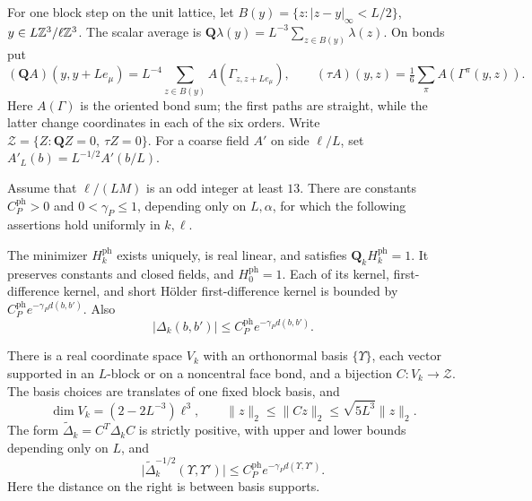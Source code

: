 For one block step on the unit lattice, let
\(B(y)=\{z:|z-y|_\infty<L/2\}\), \(y\in L\mathbb Z^3/\ell\mathbb Z^3\).
The scalar average is
\(\mathbf Q\lambda(y)=L^{-3}\sum_{z\in B(y)}\lambda(z)\).
On bonds put
\[
 (\mathbf QA)(y,y+Le_\mu)
   =L^{-4}\sum_{z\in B(y)}A(\Gamma_{z,z+Le_\mu}),\qquad
 (\tau A)(y,z)=\tfrac16\sum_\pi A(\Gamma^\pi(y,z)).
\]
Here \(A(\Gamma)\) is the oriented bond sum; the first paths are
straight, while the latter change coordinates in each of the six
orders. Write \(\mathcal Z=\{Z:\mathbf QZ=0,\ \tau Z=0\}\).
For a coarse field \(A'\) on side \(\ell/L\), set
\(A'_L(b)=L^{-1/2}A'(b/L)\).

\begin{theorem}\label{thm:maxwell-block}
Assume that \(\ell/(LM)\) is an odd integer at least \(13\).
There are constants \(C_P^{\mathrm{ph}}>0\) and
\(0<\gamma_P\le1\), depending only on \(L,\alpha\), for which
the following assertions hold uniformly in \(k,\ell\).

The minimizer \(H_k^{\mathrm{ph}}\) exists uniquely, is real
linear, and satisfies \(\mathbf Q_kH_k^{\mathrm{ph}}=1\).
It preserves constants and closed fields, and \(H_0^{\mathrm{ph}}=1\).
Each of its kernel, first-difference kernel, and short H\"older
first-difference kernel is bounded by
\(C_P^{\mathrm{ph}}e^{-\gamma_Pd(b,b')}\).
Also
\[
 |\Delta_k(b,b')|\le C_P^{\mathrm{ph}}e^{-\gamma_Pd(b,b')}.
\]

There is a real coordinate space \(V_k\) with an orthonormal
basis \(\{\Upsilon\}\), each vector supported in an \(L\)-block
or on a noncentral face bond, and a bijection \(C:V_k\to\mathcal Z\).
The basis choices are translates of one fixed block basis, and
\[
 \dim V_k=(2-2L^{-3})\ell^3,\qquad
 \|z\|_2\le\|Cz\|_2\le\sqrt{5L^3}\|z\|_2.
\]
The form \(\widetilde\Delta_k=C^T\Delta_kC\) is strictly positive,
with upper and lower bounds depending only on \(L\), and
\[
 \big|\widetilde\Delta_k^{-1/2}(\Upsilon,\Upsilon')\big|
 \le C_P^{\mathrm{ph}}e^{-\gamma_Pd(\Upsilon,\Upsilon')}.
\]
Here the distance on the right is between basis supports.


\end{theorem}
